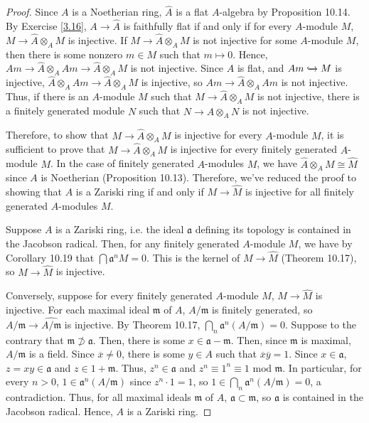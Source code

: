 \begin{proof}
Since $A$ is a Noetherian ring, $\hat A$ is a flat $A$-algebra by Proposition 10.14. By Exercise \ref{3.16},
$A \to \hat A$ is faithfully flat if and only if for every $A$-module $M$, $M \to \hat A \otimes_A M$ is injective.
If $M \to \hat A \otimes_A M$ is not injective for some $A$-module $M$, then there is some nonzero $m \in M$ such that 
$m \mapsto 0$. Hence, $Am \to \hat A \otimes_A Am \to \hat A \otimes_A M$ is not injective. Since $\hat A$ is flat, and 
$Am \xhookrightarrow{} M$ is injective, $\hat A \otimes_A Am \to \hat A \otimes_A M$ is injective, so $Am \to \hat A \otimes_A Am$
is not injective. Thus, if there is an $A$-module $M$ such that $M \to \hat A \otimes_A M$ is not injective, there is a finitely
generated module $N$ such that $N \to \hat A \otimes_A N$ is not injective.

Therefore, to show that $M \to \hat A \otimes_A M$ is injective for every $A$-module $M$, it is sufficient to prove that 
$M \to \hat A \otimes_A M$ is injective for every 
finitely generated $A$-module $M$. In the case of finitely generated $A$-modules $M$, we have $\hat A \otimes_A M \cong \hat M$ 
since $A$ is Noetherian (Proposition 10.13). Therefore, we've reduced the proof to showing that $A$ is a Zariski ring if 
and only if $M \to \hat M$ is injective for all finitely generated $A$-modules $M$.

Suppose $A$ is a Zariski ring, i.e. the ideal $\mathfrak{a}$ defining its topology is contained in the Jacobson radical. Then,
for any finitely generated $A$-module $M$, we have by Corollary 10.19 that $\bigcap \mathfrak{a}^n M = 0$. This is the kernel 
of $M \to \hat M$ (Theorem 10.17), so $M \to \hat M$ is injective. 

Conversely, suppose for every finitely generated $A$-module
$M$, $M \to \hat M$ is injective. For each maximal ideal $\mathfrak{m}$ of $A$, $A/\mathfrak{m}$ is finitely generated, so 
$A/\mathfrak{m} \to \widehat{A/\mathfrak{m}}$ is injective. By Theorem 10.17, 
$\bigcap_n \mathfrak{a}^n (A/\mathfrak{m}) = 0$. Suppose to the contrary that $\mathfrak{m} \not\supset \mathfrak{a}$. Then,
there is some $x \in \mathfrak{a} - \mathfrak{m}$. Then, since $\mathfrak{m}$ is maximal, $A/\mathfrak{m}$ is a field. Since
$\overline{x} \neq 0$, there is some $y \in A$ such that $\overline{x} \overline{y} = 1$. Since $x \in \mathfrak{a}$, 
$z = xy \in \mathfrak{a}$ and $z \in 1 + \mathfrak{m}$. Thus, $z^n \in \mathfrak{a}$ and $z^n \equiv 1^n \equiv 1 \text{ mod }\mathfrak{m}$.
In particular, for every $n > 0$, $1 \in \mathfrak{a}^n(A/\mathfrak{m})$ since $z^n \cdot 1 = 1$, so 
$1 \in \bigcap_n \mathfrak{a}^n (A/\mathfrak{m}) = 0$, a contradiction. Thus, for all maximal ideals 
$\mathfrak{m}$ of $A$, $\mathfrak{a} \subset \mathfrak{m}$, so $\mathfrak{a}$ is contained in the Jacobson radical. 
Hence, $A$ is a Zariski ring.
\end{proof}

